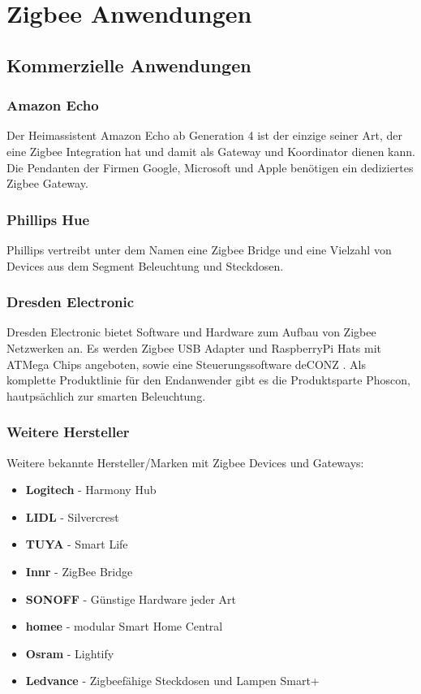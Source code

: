 \section{Zigbee Anwendungen}

\subsection{Kommerzielle Anwendungen}

\subsubsection{Amazon Echo}
    Der Heimassistent Amazon Echo ab Generation 4 ist der einzige seiner Art, der eine Zigbee Integration hat und damit als Gateway und Koordinator dienen
    kann. Die Pendanten der Firmen Google, Microsoft und Apple benötigen ein dediziertes Zigbee Gateway.

\subsubsection{Phillips Hue}
    Phillips vertreibt unter dem Namen eine Zigbee Bridge und eine Vielzahl von Devices aus dem Segment Beleuchtung und Steckdosen. 

\subsubsection{Dresden Electronic}
    Dresden Electronic bietet Software und Hardware zum Aufbau von Zigbee Netzwerken an. Es werden Zigbee USB Adapter und RaspberryPi Hats mit ATMega Chips angeboten,
    sowie eine Steuerungssoftware \grqq deCONZ \grqq{}. Als komplette Produktlinie für den Endanwender gibt es die Produktsparte
    \grqq Phoscon\grqq{}, hautpsächlich zur smarten Beleuchtung.

\subsubsection*{Weitere Hersteller}
Weitere bekannte Hersteller/Marken mit Zigbee Devices und Gateways:
\begin{itemize}
    \item \textbf{Logitech} - Harmony Hub
    \item \textbf{LIDL} - Silvercrest
    \item \textbf{TUYA} - Smart Life
    \item \textbf{Innr} - ZigBee Bridge
    \item \textbf{SONOFF} - Günstige Hardware jeder Art
    \item \textbf{homee} -  modular Smart Home Central
    \item \textbf{Osram} - Lightify
    \item \textbf{Ledvance} - Zigbeefähige Steckdosen und Lampen \grqq Smart+ \grqq{}
\end{itemize}

